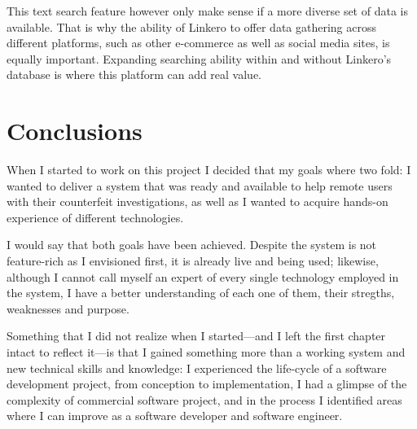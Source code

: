 This text search feature however only make sense if a more diverse set of
data is available. That is why the ability of Linkero to offer data gathering
across different platforms, such as other e-commerce as well as social media
sites, is equally important. Expanding searching ability within and without
Linkero's database is where this platform can add real value.

\section{Conclusions}
When I started to work on this project I decided that my goals where two fold: I
wanted to deliver a system that was ready and available to help remote users
with their counterfeit investigations, as well as I wanted to acquire hands-on
experience of different technologies.

I would say that both goals have been achieved. Despite the system is not
feature-rich as I envisioned first, it is already live and being used; likewise,
although I cannot call myself an expert of every single technology employed in
the system, I have a better understanding of each one of them, their stregths,
weaknesses and purpose.

Something that I did not realize when I started---and I left the first chapter
intact to reflect it---is that I gained something more than a working system and
new technical skills and knowledge: I experienced the life-cycle of a software
development project, from conception to implementation, I had a glimpse of
the complexity of commercial software project, and in the process I
identified areas where I can improve as a software developer and software
engineer.
